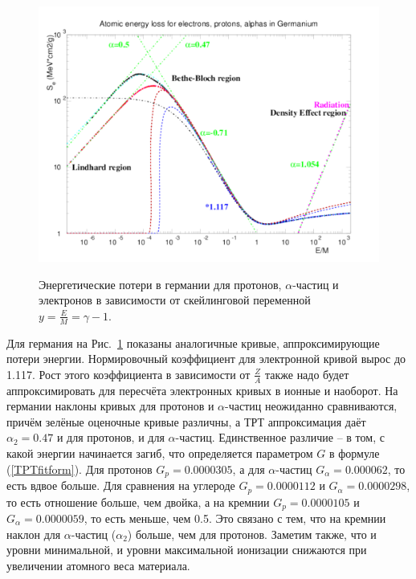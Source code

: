\documentclass[a4paper,12pt]{article}
\begin{document}
\begin{large}
    \begin{figure}[ht]
    {
       \includegraphics[width=0.99\linewidth]{images/epa_ge_l}
    }
    \caption{Энергетические потери в германии для протонов, $\alpha$-частиц и электронов в зависимости от скейлинговой переменной $y=\frac{E}{M}=\gamma-1$.}
    \label{fig:dEdxGeL}
  \end{figure}
  Для германия на Рис.~\ref{fig:dEdxGeL} показаны аналогичные кривые, аппроксимирующие потери энергии.
  Нормировочный коэффициент для электронной кривой вырос до 1.117.
  Рост этого коэффициента в зависимости от $\frac{Z}{A}$ также надо будет аппроксимировать для пересчёта электронных кривых в ионные и наоборот.
  На германии наклоны кривых для протонов и $\alpha$-частиц неожиданно сравниваются, причём зелёные оценочные кривые различны, а ТРТ аппроксимация даёт $\alpha_2=0.47$ и для протонов, и для $\alpha$-частиц.
  Единственное различие -- в том, с какой энергии начинается загиб, что определяется параметром $G$ в формуле (\ref{TPTfitform}).
  Для протонов $G_p=0.0000305$, а для $\alpha$-частиц $G_\alpha=0.000062$, то есть вдвое больше.
  Для сравнения на углероде $G_p=0.0000112$ и $G_\alpha=0.0000298$, то есть отношение больше, чем двойка, а на кремнии $G_p=0.0000105$ и $G_\alpha=0.0000059$, то есть меньше, чем 0.5.
  Это связано с тем, что на кремнии наклон для $\alpha$-частиц ($\alpha_2$) больше, чем для протонов.
  Заметим также, что и уровни минимальной, и уровни максимальной ионизации снижаются при увеличении атомного веса материала. 


\end{large}
\end{document}
